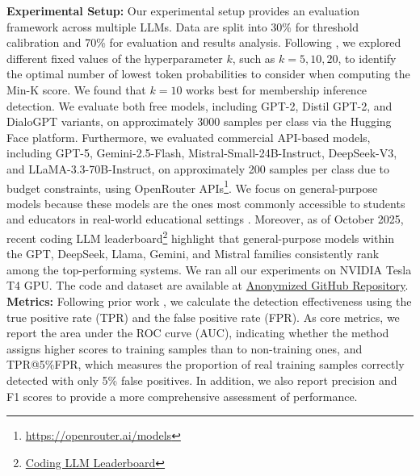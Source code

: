 \documentclass[runningheads]{llncs}
\begin{document}

\noindent \textbf{Experimental Setup:} Our experimental setup provides an evaluation framework across multiple LLMs. Data are split into 30\% for threshold calibration and 70\% for evaluation and results analysis. Following \cite{r1}, we explored different fixed values of the hyperparameter \( k \), such as \( k = 5, 10, 20 \), to identify the optimal number of lowest token probabilities to consider when computing the Min-K score. We found that \( k = 10 \) works best for membership inference detection. We evaluate both free models, including GPT-2, Distil GPT-2, and DialoGPT variants, on approximately 3000 samples per class via the Hugging Face platform. Furthermore, we evaluated commercial API-based models, including GPT-5, Gemini-2.5-Flash, Mistral-Small-24B-Instruct, DeepSeek-V3, and LLaMA-3.3-70B-Instruct, on approximately 200 samples per class due to budget constraints, using OpenRouter APIs\footnote{\url{https://openrouter.ai/models}}. We focus on general-purpose models because these models are the ones most commonly accessible to students and educators in real-world educational settings \cite{r69}. Moreover, as of October 2025, recent coding LLM leaderboard\footnote{\href{https://www.vellum.ai/best-llm-for-coding?utm_source=google&utm_medium=organic}{Coding LLM Leaderboard}} highlight that general-purpose models within the GPT, DeepSeek, Llama, Gemini, and Mistral families consistently rank among the top-performing systems. We ran all our experiments on NVIDIA Tesla T4 GPU. The code and dataset are available at \href{https://anonymous.4open.science/r/student-code-provenance-LLMs-MinK-FF0B/}{Anonymized GitHub Repository}.\\


\noindent \textbf{Metrics:}
Following prior work \cite{r1}, we calculate the detection effectiveness using the true positive rate (TPR) and the false positive rate (FPR). As core metrics, we report the area under the ROC curve (AUC), indicating whether the method assigns higher scores to training samples than to non-training ones, and TPR@5\%FPR, which measures the proportion of real training samples correctly detected with only 5\% false positives. In addition, we also report precision and F1 scores to provide a more comprehensive assessment of performance.
\end{document}
